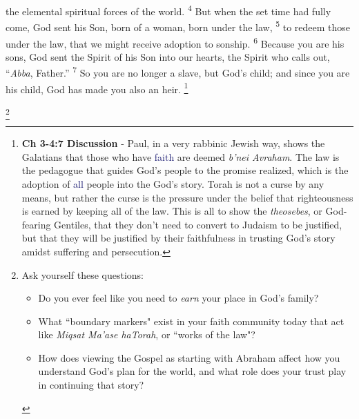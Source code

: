\documentclass[12pt,twoside]{article}
\newcommand{\vs}[1]{\textsuperscript{#1}}
\newcommand{\vnote}[2]{%
  \begingroup
  \renewcommand\thefootnote{}%
  \footnote{\scriptsize \textbf{}#2}%
  \addtocounter{footnote}{-1}%
  \endgroup
}
\begin{document}
 \noindent the elemental spiritual forces of the world.
 \vs{4} But when the set time had fully come, God sent his Son, born of a woman, born under the law,
 \vs{5} to redeem those under the law, that we might receive adoption to sonship.
 \vs{6} Because you are his sons, God sent the Spirit of his Son into our hearts, the Spirit who calls out, ``\textit{Abba}, Father.''
 \vs{7} So you are no longer a slave, but God's child; and since you are his child, God has made you also an heir.\vnote{7}{\textbf{Ch 3-4:7 Discussion} - Paul, in a very rabbinic Jewish way, shows the Galatians that those who have \textcolor{MidnightBlue}{faith} are deemed \textit{b'nei Avraham}. The law is the pedagogue that guides God's people to the promise realized, which is the adoption of \textcolor{MidnightBlue}{all} people into the God's story. Torah is not a curse by any means, but rather the curse is the pressure under the belief that righteousness is earned by keeping all of the law. This is all to show the \textit{theosebes}, or God-fearing Gentiles, that they don't need to convert to Judaism to be justified, but that they will be justified by their faithfulness in trusting God's story amidst suffering and persecution.}\vnote{7}{Ask yourself these questions:
 \begin{itemize}
     \item Do you ever feel like you need to \textit{earn} your place in God's family?
     \item What ``boundary markers" exist in your faith community today that act like \textit{Miqsat Ma'ase haTorah}, or ``works of the law"?
     \item How does viewing the Gospel as starting with Abraham affect how you understand God's plan for the world, and what role does your trust play in continuing that story?
 \end{itemize}
 }
\end{document}
